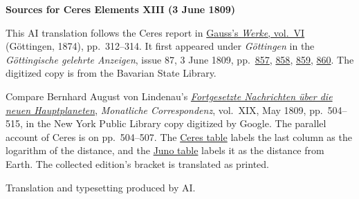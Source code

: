 \clearpage\thispagestyle{empty}
\begin{center}\textbf{Sources for Ceres Elements XIII (3 June 1809)}\end{center}
\noindent This AI translation follows the Ceres report in \href{https://gdz.sub.uni-goettingen.de/id/PPN236007467}{Gauss’s \textit{Werke}, vol.~VI} (Göttingen, 1874), pp.~312--314. It first appeared under \textit{Göttingen} in the \textit{Göttingische gelehrte Anzeigen}, issue 87, 3 June 1809, pp.~\href{https://api.digitale-sammlungen.de/iiif/image/v2/bsb10538675_00859/full/1600,/0/default.jpg}{857}, \href{https://api.digitale-sammlungen.de/iiif/image/v2/bsb10538675_00860/full/1600,/0/default.jpg}{858}, \href{https://api.digitale-sammlungen.de/iiif/image/v2/bsb10538675_00861/full/1600,/0/default.jpg}{859}, \href{https://api.digitale-sammlungen.de/iiif/image/v2/bsb10538675_00862/full/1600,/0/default.jpg}{860}. The digitized copy is from the Bavarian State Library.
\par\smallskip\noindent Compare Bernhard August von Lindenau’s \href{https://archive.org/download/bub_gb_caMAAAAAMAAJ/page/n518.jpg}{\textit{Fortgesetzte Nachrichten über die neuen Hauptplaneten}}, \textit{Monatliche Correspondenz}, vol.~XIX, May 1809, pp.~504--515, in the New York Public Library copy digitized by Google. The parallel account of Ceres is on pp.~504--507. The \href{https://archive.org/download/bub_gb_caMAAAAAMAAJ/page/n525.jpg}{Ceres table} labels the last column as the logarithm of the distance, and the \href{https://archive.org/download/bub_gb_caMAAAAAMAAJ/page/n526.jpg}{Juno table} labels it as the distance from Earth. The collected edition’s bracket is translated as printed.
\par\smallskip\noindent Translation and typesetting produced by AI.
\clearpage
